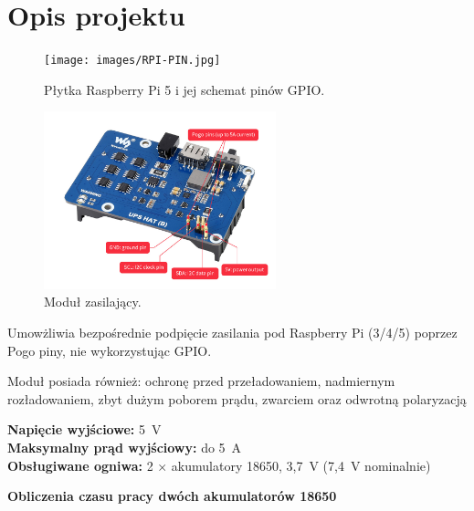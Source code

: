 \documentclass[magisterska]{pracadypl}
\begin{document}
\section{Opis projektu}

\begin{figure}[H]  %
    \centering  %
    \texttt{[image: images/RPI-PIN.jpg]}  %
    \captionsetup{font=footnotesize}
    \caption[Płytka Raspberry Pi 5 i jej schemat pinów GPIO. https://www.hackatronic.com/wp-content/uploads/2024/03/Raspberry-Pi-5-Pinout--1210x642.jpg]{Płytka Raspberry Pi 5 i jej schemat pinów GPIO.}
\end{figure}

\begin{figure}[H]  %
    \centering  %
    \includegraphics[width=0.6\textwidth]{images/ups-hat.jpg}  %
    \captionsetup{font=footnotesize}
    \caption[Moduł zasilający. https://www.waveshare.com/wiki/UPS-HAT-(B)]{Moduł zasilający.}
\end{figure}

Umowżliwia bezpośrednie podpięcie zasilania pod Raspberry Pi (3/4/5) poprzez Pogo piny, nie wykorzystując GPIO.

Moduł posiada również: ochronę przed przeładowaniem, nadmiernym rozładowaniem, zbyt dużym poborem prądu, zwarciem oraz odwrotną polaryzacją

\textbf{Napięcie wyjściowe:} 5~V \\
\textbf{Maksymalny prąd wyjściowy:} do 5~A \\
\textbf{Obsługiwane ogniwa:} 2 × akumulatory 18650, 3{,}7~V (7{,}4~V nominalnie)

\textbf{Obliczenia czasu pracy dwóch akumulatorów 18650}
\end{document}
